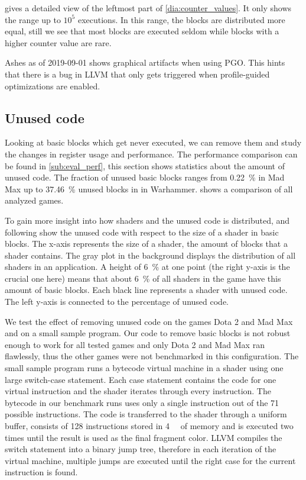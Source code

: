  gives a detailed view of the leftmost part of \cref{dia:counter_values}.
It only shows the range up to $10^5$ executions.
In this range, the blocks are distributed more equal, still we see that most blocks are executed seldom while blocks with a higher counter value are rare.


Ashes as of 2019-09-01 shows graphical artifacts when using PGO.
This hints that there is a bug in LLVM that only gets triggered when profile-guided optimizations are enabled.

\subsection{Unused code}
\label{sub:eval_unused}
Looking at basic blocks which get never executed, we can remove them and study the changes in register usage and performance.
The performance comparison can be found in \cref{sub:eval_perf}, this section shows statistics about the amount of unused code.
The fraction of unused basic blocks ranges from \SI{0.22}{\percent} in Mad Max up to \SI{37.46}{\percent} unused blocks in in Warhammer.
 shows a comparison of all analyzed games.


To gain more insight into how shaders and the unused code is distributed,  and following show the unused code with respect to the size of a shader in basic blocks.
The x-axis represents the size of a shader, the amount of blocks that a shader contains.
The gray plot in the background displays the distribution of all shaders in an application.
A height of \SI{6}{\percent} at one point (the right y-axis is the crucial one here) means that about \SI{6}{\percent} of all shaders in the game have this amount of basic blocks.
Each black line represents a shader with unused code. The left y-axis is connected to the percentage of unused code.


We test the effect of removing unused code on the games Dota 2 and Mad Max and on a small sample program.
Our code to remove basic blocks is not robust enough to work for all tested games and only Dota 2 and Mad Max ran flawlessly, thus the other games were not benchmarked in this configuration.
The small sample program runs a bytecode virtual machine in a shader using one large switch-case statement.
Each case statement contains the code for one virtual instruction and the shader iterates through every instruction.
The bytecode in our benchmark runs uses only a single instruction out of the 71 possible instructions.
The code is transferred to the shader through a uniform buffer, consists of 128 instructions stored in \SI{4}{\kibi\byte} of memory and is executed two times until the result is used as the final fragment color.
LLVM compiles the switch statement into a binary jump tree, therefore in each iteration of the virtual machine, multiple jumps are executed until the right case for the current instruction is found.

